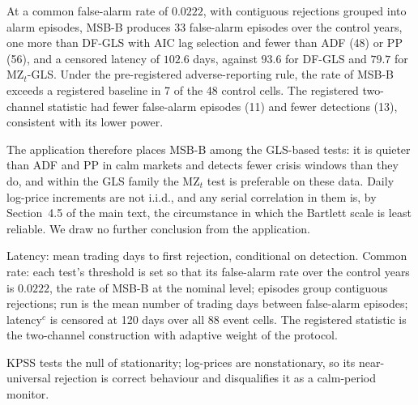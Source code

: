 \documentclass[11pt]{article}
\newcommand{\RMGLS}{MSB-B}
\begin{document}
At a common false-alarm rate of $0.0222$, with contiguous rejections
grouped into alarm episodes, \RMGLS{} produces 33 false-alarm episodes
over the control years, one more than DF-GLS with AIC lag selection and
fewer than ADF (48) or PP (56), and a censored latency of $102.6$ days,
against $93.6$ for DF-GLS and $79.7$ for MZ$_t$-GLS. Under the
pre-registered adverse-reporting rule, the rate of \RMGLS{} exceeds a
registered baseline in 7 of the 48 control cells. The registered
two-channel statistic had fewer false-alarm episodes (11) and fewer
detections (13), consistent with its lower power.

The application therefore places \RMGLS{} among the GLS-based tests: it
is quieter than ADF and PP in calm markets and detects fewer crisis
windows than they do, and within the GLS family the MZ$_t$ test is
preferable on these data. Daily log-price increments are not i.i.d.,
and any serial correlation in them is, by Section~4.5 of the main text, the
circumstance in which the Bartlett scale is least reliable. We draw no further conclusion from the
application.

\begin{table}[t]
\centering
\caption{Pre-registered application: false positives over 48 control
cells and detections over 88 event cells, $\alpha = 0.05$, and the
comparison at a common false-alarm rate of $0.0222$.}
\label{tab:fp}
\begin{threeparttable}
\footnotesize

\begin{tablenotes}\footnotesize
\item Latency: mean trading days to first rejection, conditional on
detection. Common rate: each test's threshold is set so that its
false-alarm rate over the control years is $0.0222$, the rate of
\RMGLS{} at the nominal level; episodes group
contiguous rejections; run is the mean number of trading days between
false-alarm episodes; latency$^c$ is censored at 120 days over all 88
event cells. The registered statistic is the two-channel construction
with adaptive weight of the protocol.
\item[$a$] KPSS tests the null of stationarity; log-prices are
nonstationary, so its near-universal rejection is correct behaviour and
disqualifies it as a calm-period monitor.
\end{tablenotes}
\end{threeparttable}
\end{table}
\end{document}
